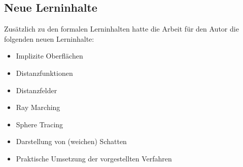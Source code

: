 \subsection{Neue Lerninhalte}
\label{subsec:new_learning_contents}

Zusätzlich zu den formalen Lerninhalten hatte die Arbeit für den Autor
die folgenden neuen Lerninhalte:
\begin{itemize}
    \item{Implizite Oberflächen}
    \item{Distanzfunktionen}
    \item{Distanzfelder}
    \item{Ray Marching}
    \item{Sphere Tracing}
    \item{Darstellung von (weichen) Schatten}
    \item{Praktische Umsetzung der vorgestellten Verfahren}
\end{itemize}
